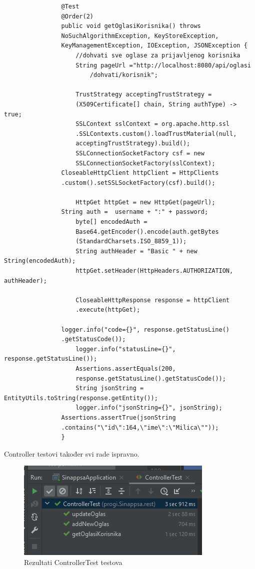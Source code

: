 			\begin{verbatim}
			    @Test
			    @Order(2)
			    public void getOglasiKorisnika() throws 
			    NoSuchAlgorithmException, KeyStoreException, 
			    KeyManagementException, IOException, JSONException {
			        //dohvati sve oglase za prijavljenog korisnika
			        String pageUrl ="http://localhost:8080/api/oglasi
			            /dohvati/korisnik";
					
			        TrustStrategy acceptingTrustStrategy = 
			        (X509Certificate[] chain, String authType) -> true;
			        SSLContext sslContext = org.apache.http.ssl
			        .SSLContexts.custom().loadTrustMaterial(null, 
			        acceptingTrustStrategy).build();
			        SSLConnectionSocketFactory csf = new 
			        SSLConnectionSocketFactory(sslContext);
		        CloseableHttpClient httpClient = HttpClients
		        .custom().setSSLSocketFactory(csf).build();
					
			        HttpGet httpGet = new HttpGet(pageUrl);
		        String auth =  username + ":" + password;
			        byte[] encodedAuth = 
			        Base64.getEncoder().encode(auth.getBytes
			        (StandardCharsets.ISO_8859_1));
			        String authHeader = "Basic " + new String(encodedAuth);
			        httpGet.setHeader(HttpHeaders.AUTHORIZATION, authHeader);
					
			        CloseableHttpResponse response = httpClient
			        .execute(httpGet);
					
		        logger.info("code={}", response.getStatusLine()
		        .getStatusCode());
			        logger.info("statusLine={}", response.getStatusLine());
			        Assertions.assertEquals(200, 
			        response.getStatusLine().getStatusCode());
			        String jsonString = EntityUtils.toString(response.getEntity());
			        logger.info("jsonString={}", jsonString);
		        Assertions.assertTrue(jsonString
		        .contains("\"id\":164,\"ime\":\"Milica\""));
			    }
			\end{verbatim}
			Controller testovi također svi rade ispravno.
			
			\begin{figure}[H]
				\includegraphics[scale=1]{slike/ispitivanje3.PNG} 
				\centering
				\caption{Rezultati ControllerTest testova}
				\label{fig:ControllerTest}
			\end{figure}
		
